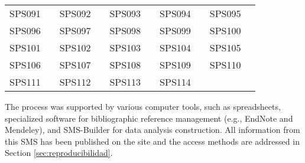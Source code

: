 \begin{table*}[ht]
\begin{tabular}{p{1.3cm}p{1.0cm}p{1.3cm}p{1.0cm}p{1.3cm}p{1.0cm}p{1.3cm}p{1.0cm}p{1.3cm}p{1.0cm}}
		SPS091      & \cite{10.1145/1551609.1551634}         & SPS092      & \cite{10.1145/1646468.1646469}         & SPS093      & \cite{Mukherjee2012}         & SPS094      & \cite{Callaghan2017}         & SPS095      & \cite{Zhang2007}         \\
		SPS096      & \cite{10.1145/3363554}         & SPS097      & \cite{Alrajeh2018}         & SPS098      & \cite{10.5555/1516744.1516935}         & SPS099      & \cite{Sly-Delgado2023}         & SPS100      & \cite{Hey2002}        \\
		SPS101      & \cite{10.1145/1383422.1383435}        & SPS102      & \cite{Liu2021}        & SPS103      & \cite{10.5555/1413370.1413393}        & SPS104      & \cite{10.5555/3571885.3571916}        & SPS105      & \cite{Maassen2011}        \\
		SPS106      & \cite{Zhang2010}        & SPS107      & \cite{Bittencourt2010}        & SPS108      & \cite{Meng2015}        & SPS109      & \cite{Freyermuth2021}        & SPS110      & \cite{Shieh2014}        \\
		SPS111      & \cite{10.1145/3053600.3053612}        & SPS112      & \cite{Alam2023}        & SPS113      & \cite{Benton2011}        & SPS114      & \cite{Deelman2009}        &             &              \\
		\hline
	\end{tabular}
	\label{table:selected_primary_studies}
\end{table*}

The process was supported by various computer tools, such as spreadsheets, specialized software for bibliographic reference management (e.g., EndNote and Mendeley), and SMS-Builder \cite{sms-builder-repo} for data analysis construction. All information from this SMS has been published on the site \cite{sms-builder-own-container} and the access methods are addressed in Section \ref{sec:reproducibilidad}.